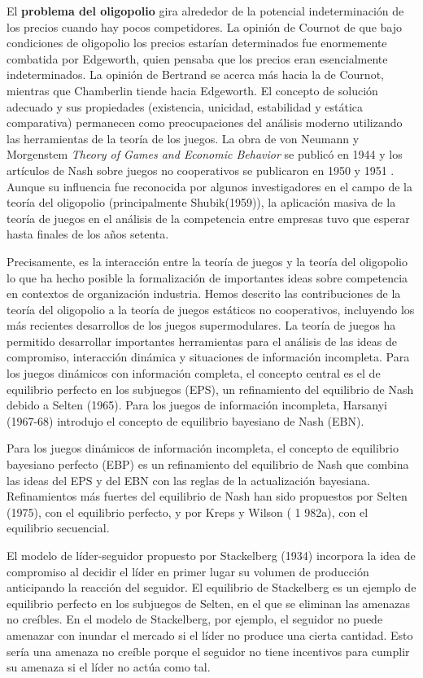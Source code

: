 \documentclass[10pt,a4paper]{article}
\begin{document}
El \textbf{problema del oligopolio} gira alrededor de la potencial indeterminación de los precios cuando hay pocos competidores. La opinión de Cournot de que bajo condiciones de oligopolio los precios estarían determinados fue enormemente combatida por Edgeworth, quien pensaba que los precios eran esencialmente indeterminados. La opinión de Bertrand se acerca más hacia la de Cournot, mientras que Chamberlin tiende hacia Edgeworth. El concepto de solución adecuado y sus propiedades (existencia, unicidad, estabilidad y estática comparativa) permanecen como preocupaciones del análisis moderno utilizando las herramientas de la teoría de los juegos. La obra de von Neumann y Morgenstem \textit{Theory of Games and Economic Behavior} se publicó en 1944 y los artículos de Nash sobre juegos no cooperativos se publicaron en 1950 y 1951 . Aunque su influencia fue reconocida por algunos investigadores en el campo de la teoría del oligopolio (principalmente Shubik(1959)), la aplicación masiva de la teoría de juegos en el análisis de la competencia entre empresas tuvo que esperar hasta finales de los años setenta. 

Precisamente, es la interacción entre la teoría de juegos y la teoría del oligopolio lo que ha hecho posible la formalización de importantes ideas sobre competencia en contextos de organización industria. Hemos descrito las contribuciones de la teoría del oligopolio a la teoría de juegos estáticos no cooperativos, incluyendo los más recientes desarrollos de los juegos supermodulares. La teoría de juegos ha permitido desarrollar importantes herramientas para el análisis de las ideas de compromiso, interacción dinámica y situaciones de información incompleta. Para los juegos dinámicos con información completa, el concepto central es el de equilibrio perfecto en los subjuegos (EPS), un refinamiento del equilibrio de Nash debido a Selten (1965). Para los juegos de información incompleta, Harsanyi (1967-68) introdujo el concepto de equilibrio bayesiano de Nash (EBN). 

Para los juegos dinámicos de información incompleta, el concepto de equilibrio bayesiano perfecto (EBP) es un refinamiento del equilibrio de Nash que combina las ideas del EPS y del EBN con las reglas de la actualización bayesiana. Refinamientos más fuertes del equilibrio de Nash han sido propuestos por Selten (1975), con el equilibrio perfecto, y por Kreps y Wilson ( 1 982a), con el equilibrio secuencial. 

El modelo de líder-seguidor propuesto por Stackelberg (1934) incorpora la idea de compromiso al decidir el líder en primer lugar su volumen de producción anticipando la reacción del seguidor. El equilibrio de Stackelberg es un ejemplo de equilibrio perfecto en los subjuegos de Selten, en el que se eliminan las amenazas no creíbles. En el modelo de Stackelberg, por ejemplo, el seguidor no puede amenazar con inundar el mercado si el líder no produce una cierta cantidad. Esto sería una amenaza no creíble porque el seguidor no tiene incentivos para cumplir su amenaza si el líder no actúa como tal. 
\end{document}
